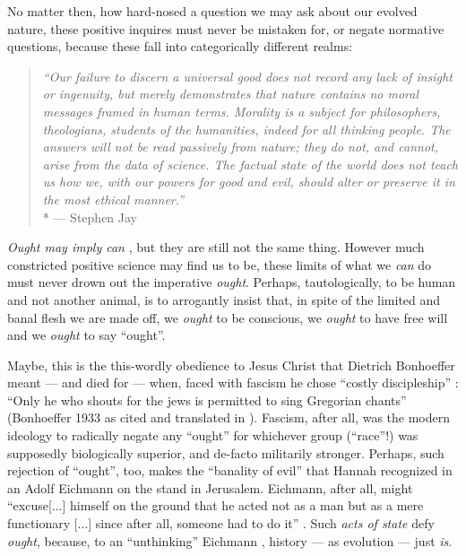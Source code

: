 No matter then, how hard-nosed a question we may ask about our evolved nature, these positive inquires must never be mistaken for, or negate normative questions, because these fall into categorically different realms:
\begin{quote}
	\emph{``Our failure to discern a universal good does not record any lack of insight or ingenuity, but merely demonstrates that nature contains no moral messages framed in human terms. 
	Morality is a subject for philosophers, theologians, students of the humanities, indeed for all thinking people. 
	The answers will not be read passively from nature; they do not, and cannot, arise from the data of science. 
	The factual state of the world does not teach us how we, with our powers for good and evil, should alter or preserve it in the most ethical manner.''}\\*
	--- Stephen Jay \citet[43]{Gould1982}
\end{quote}

\emph{Ought may imply can} \citep[65]{Kant1794}, but they are still not the same thing. 
However much constricted positive science may find us to be, these limits of what we \emph{can} do must never drown out the imperative \emph{ought}. 
Perhaps, tautologically, to be human and not another animal, is to arrogantly insist that, in spite of the limited and banal flesh we are made off, we \emph{ought} to be conscious, we \emph{ought} to have free will and we \emph{ought} to say ``ought''. 

Maybe, this is the this-wordly obedience to Jesus Christ that Dietrich Bonhoeffer meant --- and died for --- when, faced with fascism he chose ``costly discipleship'' \citep{Bonhoeffer1937}: ``Only he who shouts for the jews is permitted to sing Gregorian chants'' (Bonhoeffer 1933 as cited and translated in \citealt[35]{DeGruchy1999}). 
Fascism, after all, was the modern ideology to radically negate any ``ought'' for whichever group (``race''!) was supposedly biologically superior, and de-facto militarily stronger.
Perhaps, such rejection of ``ought'', too, makes the ``banality of evil'' that Hannah \cite{Arendt1963} recognized in an Adolf Eichmann on the stand in Jerusalem. 
Eichmann, after all, might ``excuse[...] himself on the ground that he acted not as a man but as a mere functionary [...] since after all, someone had to do it'' \citep[K286f.]{Arendt1963}. 
Such \emph{acts of state} defy \emph{ought}, because, to an ``unthinking'' Eichmann \citep[K187f.]{Arendt1963}, history --- as evolution --- just \emph{is}.

